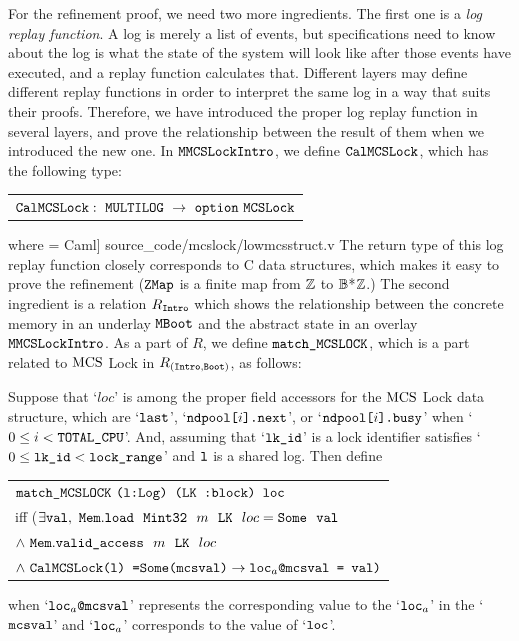 For the refinement proof, we need two more ingredients.
The first one is a \emph{log replay function}.
A log is merely a list of events, but specifications need to know about the log is what the state of the system will look like after those events have executed,
and a replay function calculates that. 
Different layers may define different replay functions in order to interpret the same log in a way that suits their proofs.
Therefore, we have introduced the proper log replay function in several layers, and prove the relationship between the result of them when we introduced the new one.
In ${\mathrm{\texttt{MMCSLockIntro}}}$, we define ${\mathrm{\texttt{CalMCSLock}}}$, which has the following type:\newline
\begin{tabular}{P{0.95\textwidth}}
$ \calmcslock :\ \lockmultilog\ \rightarrow\ \optiondef\ \lockabsloc$
\end{tabular}\newline
where
 = Caml] {source_code/mcslock/lowmcsstruct.v}
The return type of this log replay function closely corresponds to C data structures, which makes it easy to prove the refinement (${\mathrm{\texttt{ZMap}}}$ is a finite map from ${\mathbb{Z}}$ to ${\mathbb{B}}$*${\mathbb{Z}}$.)
The second ingredient is a relation $R_{{\mathrm{\texttt{Intro}}}}$ which shows the relationship between the concrete memory in an underlay ${\mathrm{\texttt{MBoot}}}$ and the abstract state in an overlay ${\mathrm{\texttt{MMCSLockIntro}}}$.
As a part of $R$, we define $\matchmcslock$, which is a part related to 
 $\mathrm{MCS}$ Lock in $R_{({\mathrm{\texttt{Intro}}}, {\mathrm{\texttt{Boot}}})}$,  as follows:

\begin{definition}[$\matchmcslock$]
Suppose that `$loc$' is among the proper field accessors for  the $\mathrm{MCS}$ Lock data structure, which are `${\mathrm{\texttt{last}}}$', `${\mathrm{\texttt{ndpool[}}}i{\mathrm{\texttt{].next}}}$', or  `${\mathrm{\texttt{ndpool[}}}i{\mathrm{\texttt{].busy}}}$' when `$0 \leq i < {\mathrm{\texttt{TOTAL\_CPU}}}$'.
 And, assuming that `${\mathrm{\texttt{lk\_id}}}$' is a lock identifier satisfies `$0 \leq {\mathrm{\texttt{lk\_id}}} < {\mathrm{\texttt{lock\_range}}}$' and ${\mathrm{\texttt{l}}}$ is a shared log. Then define \newline
  \begin{tabular}{P{0.90\textwidth}}
    $\matchmcslock\ \codeinmath{(l:Log) (}\lockmemloc\codeinmath{ :block) loc}$\\
      iff ($\exists \codeinmath{val},\ \memloadsome{\memintregulartype}{m}{\lockmemloc}{loc}{\codeinmath{val}}$\\
        $\wedge\  {\mathrm{\texttt{Mem}}} . {\mathrm{\texttt{valid\_access}}} ~~{m} ~~ {{\mathrm{\texttt{LK}}}} ~~ {loc}$\\
      $\wedge\ \calmcslock \codeinmath{(l) =}\Some\codeinmath{(mcsval)}\rightarrow\codeinmath{loc}_{a}\codeinmath{@mcsval = val)}$\\
\end{tabular}\newline
    when `${\mathrm{\texttt{loc}}}_{a}{\mathrm{\texttt{@mcsval}}}$' represents the corresponding 
    value to the `${\mathrm{\texttt{loc}}}_{a}$' in the `${\mathrm{\texttt{mcsval}}}$' 
    and `${\mathrm{\texttt{loc}}}_{a}$' corresponds to the value of `${\mathrm{\texttt{loc}}}$'.
\end{definition}

